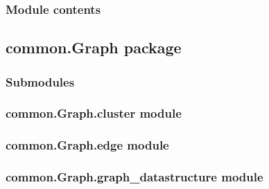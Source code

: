 \documentclass[letterpaper,10pt,english]{sphinxmanual}
\begin{document}

\begin{fulllineitems}
\label{\detokenize{common.DataTurksAlgos:common.DataTurksAlgos.pictures_exporter.dir_path}}
\end{fulllineitems}



\subsubsection{Module contents}
\label{\detokenize{common.DataTurksAlgos:module-common.DataTurksAlgos}}\label{\detokenize{common.DataTurksAlgos:module-contents}}

\subsection{common.Graph package}
\label{\detokenize{common.Graph:common-graph-package}}\label{\detokenize{common.Graph::doc}}

\subsubsection{Submodules}
\label{\detokenize{common.Graph:submodules}}

\subsubsection{common.Graph.cluster module}
\label{\detokenize{common.Graph:common-graph-cluster-module}}

\subsubsection{common.Graph.edge module}
\label{\detokenize{common.Graph:common-graph-edge-module}}

\subsubsection{common.Graph.graph\_datastructure module}
\label{\detokenize{common.Graph:common-graph-graph-datastructure-module}}
\end{document}
